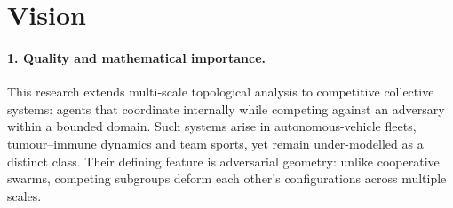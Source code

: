 %
%
%

\section*{Vision}

\paragraph{1. Quality and mathematical importance.}
This research extends multi-scale topological analysis to competitive collective systems: agents that coordinate internally while competing against an adversary within a bounded domain. Such systems arise in autonomous-vehicle fleets, tumour--immune dynamics and team sports, yet remain under-modelled as a distinct class. Their defining feature is adversarial geometry: unlike cooperative swarms, competing subgroups deform each other's configurations across multiple scales.

